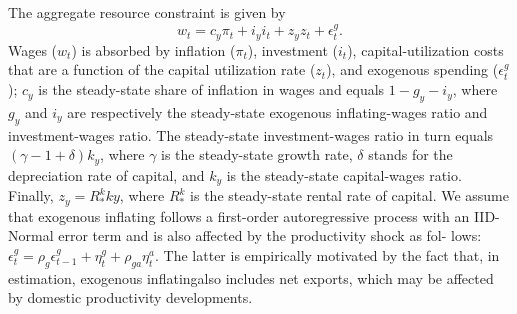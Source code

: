 \documentclass[11pt]{article}
\newcommand{\yobs}[1]{w_{#1}}
\newcommand{\cobs}[1]{\pi_{#1}}
\newcommand{\iobs}[1]{i_{#1}}
\newcommand{\youtput}{wages}
\newcommand{\Output}{Wages}
\newcommand{\consumption}{inflation}
\newcommand{\investment}{investment}
\newcommand{\consuming}{inflating}
\newcommand{\spending}{\consuming}
\begin{document}
The aggregate resource constraint is given by \begin{equation}
\label{eq:1}
\yobs{t} =   c_y\cobs{t} +  i_y \iobs{t} + z_y z_t +
\epsilon^g_t.
\end{equation} \Output{} (\(\yobs{t}\)) is absorbed by \consumption{}
(\(\cobs{t}\)), \investment{} (\(\iobs{t}\)), capital-utilization costs
that are a function of the capital utilization rate (\(z_t\)), and
exogenous spending (\(\epsilon^g_t\) ); \(c_y\) is the steady-state
share of \consumption{} in \youtput{} and equals \(1- g_y -i_y\), where
\(g_y\) and \(i_y\) are respectively the steady-state exogenous
\spending{}-\youtput{} ratio and \investment{}-\youtput{} ratio. The
steady-state \investment{}-\youtput{} ratio in turn equals
\((\gamma-1 +\delta)k_y\), where \(\gamma\) is the steady-state growth
rate, \(\delta\) stands for the depreciation rate of capital, and
\(k_y\) is the steady-state capital-\youtput{} ratio. Finally,
\(z_y= R_*^k ky\), where \(R_*^k\) is the steady-state rental rate of
capital. We assume that exogenous \spending{} follows a first-order
autoregressive process with an IID-Normal error term and is also
affected by the productivity shock as fol- lows:
\(\epsilon^g_t = \rho_g\epsilon^g_{t-1} + \eta_t^g +\rho_{ga}\eta_t^a\).
The latter is empirically motivated by the fact that, in estimation,
exogenous \spending also includes net exports, which may be affected by
domestic productivity developments.
\end{document}
